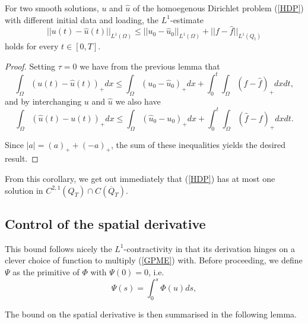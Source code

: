 \documentclass[11pt, a4paper]{article}
\begin{document}
\begin{cor}[$L^1$-contractivity]
\label{cor:l1-contractivity_classical}
For two smooth solutions, $u$ and $\hat{u}$ of the homoegenous Dirichlet problem (\ref{HDP}) with different initial data and loading, the $L^1$-estimate
\begin{equation}
\label{l1_contractivity}
||u(t) - \hat{u}(t)||_{L^1(\Omega)} \leq ||u_0 - \hat{u}_0||_{L^1(\Omega)} + ||f-\hat{f}||_{L^1(Q_t)}
\end{equation}
holds for every $t\in [0,T]$.
\end{cor}

\begin{proof}
Setting $\tau = 0$ we have from the previous lemma that
\begin{equation*}
\int_\Omega  (u(t)-\hat{u}(t))_+dx \leq \int_\Omega (u_0 - \hat{u}_0)_+dx + \int_0^t \int_\Omega (f-\hat{f})_+ dxdt,
\end{equation*}
and by interchanging $u$ and $\hat{u}$ we also have 
\begin{equation*}
\int_\Omega  (\hat{u}(t)-u(t))_+dx \leq \int_\Omega (\hat{u}_0 - u_0)_+dx + \int_0^t \int_\Omega (\hat{f}-f)_+ dxdt.
\end{equation*}

Since $|a| = (a)_+ + (-a)_+$, the sum of these inequalities yields the desired result.
\end{proof}

\setcounter{obs}{0}
\begin{obs}
From this corollary, we get out immediately that (\ref{HDP}) has at most one solution in $C^{2,1}(Q_T)\cap C(\overline{Q}_T)$.
\end{obs}

\subsection{Control of the spatial derivative}
This bound follows nicely the $L^1$-contractivity in that its derivation hinges on a clever choice of function to multiply (\ref{GPME}) with. Before proceeding, we define  $\Psi$ as the primitive of $\Phi$ with $\Psi(0) = 0$, i.e.
\begin{equation}
\label{phi_primitive}
	\Psi(s) = \int_0^s \Phi(u) ds,
\end{equation}

The bound on the spatial derivative is then summarised in the following lemma.
\end{document}
